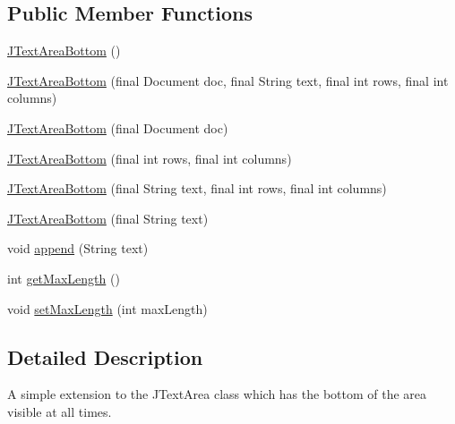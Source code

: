 \subsection*{Public Member Functions}
\begin{DoxyCompactItemize}
\item 
\hyperlink{classgov_1_1fnal_1_1ppd_1_1dd_1_1util_1_1guiUtils_1_1JTextAreaBottom_a0dfcd08ba2af7a269c879f24c63d36da}{J\-Text\-Area\-Bottom} ()
\item 
\hyperlink{classgov_1_1fnal_1_1ppd_1_1dd_1_1util_1_1guiUtils_1_1JTextAreaBottom_a52062eb76a11640a08aadd36d438cbf7}{J\-Text\-Area\-Bottom} (final Document doc, final String text, final int rows, final int columns)
\item 
\hyperlink{classgov_1_1fnal_1_1ppd_1_1dd_1_1util_1_1guiUtils_1_1JTextAreaBottom_ad8f8766ae75159111d67ae15a94ee9e5}{J\-Text\-Area\-Bottom} (final Document doc)
\item 
\hyperlink{classgov_1_1fnal_1_1ppd_1_1dd_1_1util_1_1guiUtils_1_1JTextAreaBottom_a049b9c3afc393eeb0425d9479081f3a4}{J\-Text\-Area\-Bottom} (final int rows, final int columns)
\item 
\hyperlink{classgov_1_1fnal_1_1ppd_1_1dd_1_1util_1_1guiUtils_1_1JTextAreaBottom_a060b28650ba322c50250ccd3abdf21fd}{J\-Text\-Area\-Bottom} (final String text, final int rows, final int columns)
\item 
\hyperlink{classgov_1_1fnal_1_1ppd_1_1dd_1_1util_1_1guiUtils_1_1JTextAreaBottom_af08d68ec3ff4ee1b7f7ac9e3d9e3369b}{J\-Text\-Area\-Bottom} (final String text)
\item 
void \hyperlink{classgov_1_1fnal_1_1ppd_1_1dd_1_1util_1_1guiUtils_1_1JTextAreaBottom_a1e24da590e9d144aeaf2b038567fbc9d}{append} (String text)
\item 
int \hyperlink{classgov_1_1fnal_1_1ppd_1_1dd_1_1util_1_1guiUtils_1_1JTextAreaBottom_a5026b4735f7977c04fc067c14e1d823e}{get\-Max\-Length} ()
\item 
void \hyperlink{classgov_1_1fnal_1_1ppd_1_1dd_1_1util_1_1guiUtils_1_1JTextAreaBottom_aef8184ebb1016ea7a0a02bff3f73b4cd}{set\-Max\-Length} (int max\-Length)
\end{DoxyCompactItemize}


\subsection{Detailed Description}
A simple extension to the J\-Text\-Area class which has the bottom of the area visible at all times. 

